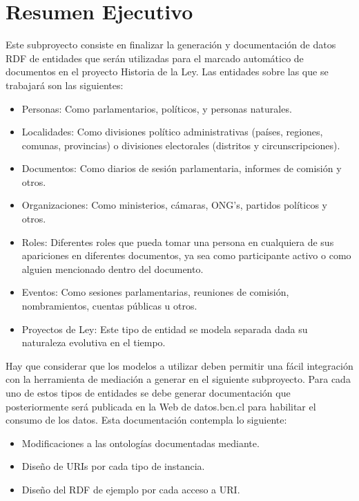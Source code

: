 \chapter*{Resumen Ejecutivo}
\thispagestyle{empty}
Este subproyecto consiste en finalizar la generación y documentación de datos RDF de
entidades que serán utilizadas para el marcado automático de documentos en el proyecto
Historia de la Ley. Las entidades sobre las que se trabajará son las siguientes:
\begin{itemize}
 \item Personas: Como parlamentarios, políticos, y personas naturales.
 \item Localidades: Como divisiones político administrativas (países, regiones, comunas, provincias) o divisiones electorales (distritos y circunscripciones).
 \item Documentos: Como diarios de sesión parlamentaria, informes de comisión y otros.
 \item Organizaciones: Como ministerios, cámaras, ONG’s, partidos políticos y otros.
 \item Roles: Diferentes roles que pueda tomar una persona en cualquiera de sus apariciones en diferentes documentos, ya sea como participante activo o como
alguien mencionado dentro del documento.
 \item Eventos: Como sesiones parlamentarias, reuniones de comisión, nombramientos, cuentas públicas u otros.
 \item Proyectos de Ley: Este tipo de entidad se modela separada dada su naturaleza evolutiva en el tiempo.
\end{itemize}


Hay que considerar que los modelos a utilizar deben permitir una fácil integración con la
herramienta de mediación a generar en el siguiente subproyecto. Para cada uno de estos tipos de entidades se debe generar documentación que
posteriormente será publicada en la Web de datos.bcn.cl para habilitar el consumo de los
datos. Esta documentación contempla lo siguiente:
\begin{itemize}
 \item Modificaciones a las ontologías documentadas mediante.
 \item Diseño de URIs por cada tipo de instancia.
 \item Diseño del RDF de ejemplo por cada acceso a URI.
\end{itemize}


